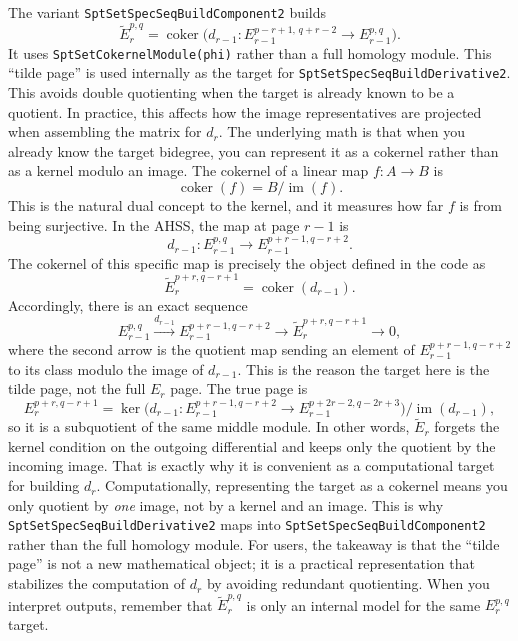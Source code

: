 \documentclass{SciPost}
\begin{document}
The variant \texttt{SptSetSpecSeqBuildComponent2} builds
\begin{equation}
\widetilde{E}_r^{p,q} = \operatorname{coker}\bigl(d_{r-1}: E_{r-1}^{p-r+1,\,q+r-2} \to E_{r-1}^{p,q}\bigr).
\end{equation}
It uses \texttt{SptSetCokernelModule(phi)} rather than a full homology module.
This ``tilde page'' is used internally as the target for \texttt{SptSetSpecSeqBuildDerivative2}.
This avoids double quotienting when the target is already known to be a quotient.
In practice, this affects how the image representatives are projected when assembling the matrix for $d_r$.
The underlying math is that when you already know the target bidegree, you can represent it as a cokernel rather than as a kernel modulo an image.
The cokernel of a linear map $f:A\to B$ is
\begin{equation}
\operatorname{coker}(f)=B/\operatorname{im}(f).
\end{equation}
This is the natural dual concept to the kernel, and it measures how far $f$ is from being surjective.
In the AHSS, the map at page $r-1$ is
\begin{equation}
d_{r-1}: E_{r-1}^{p,q} \to E_{r-1}^{p+r-1,q-r+2}.
\end{equation}
The cokernel of this specific map is precisely the object defined in the code as
\begin{equation}
\widetilde{E}_r^{p+r,q-r+1} = \operatorname{coker}(d_{r-1}).
\end{equation}
Accordingly, there is an exact sequence
\begin{equation}
E_{r-1}^{p,q} \xrightarrow{d_{r-1}} E_{r-1}^{p+r-1,q-r+2} \longrightarrow \widetilde{E}_r^{p+r,q-r+1} \to 0,
\end{equation}
where the second arrow is the quotient map sending an element of $E_{r-1}^{p+r-1,q-r+2}$ to its class modulo the image of $d_{r-1}$.
This is the reason the target here is the tilde page, not the full $E_r$ page.
The true page is
\begin{equation}
E_r^{p+r,q-r+1} = \ker\bigl(d_{r-1}: E_{r-1}^{p+r-1,q-r+2} \to E_{r-1}^{p+2r-2,q-2r+3}\bigr)\big/\operatorname{im}(d_{r-1}),
\end{equation}
so it is a subquotient of the same middle module.
In other words, $\widetilde{E}_r$ forgets the kernel condition on the outgoing differential and keeps only the quotient by the incoming image.
That is exactly why it is convenient as a computational target for building $d_r$.
Computationally, representing the target as a cokernel means you only quotient by \emph{one} image, not by a kernel and an image.
This is why \texttt{SptSetSpecSeqBuildDerivative2} maps into \texttt{SptSetSpecSeqBuildComponent2} rather than the full homology module.
For users, the takeaway is that the ``tilde page'' is not a new mathematical object; it is a practical representation that stabilizes the computation of $d_r$ by avoiding redundant quotienting.
When you interpret outputs, remember that $
\widetilde{E}_r^{p,q}$ is only an internal model for the same $E_r^{p,q}$ target.
\end{document}
